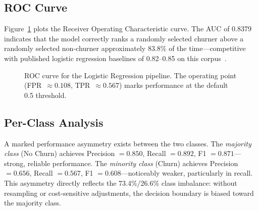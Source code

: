 \documentclass{llncs}
\begin{document}
\subsection{ROC Curve}

Figure~\ref{fig:roc} plots the Receiver Operating Characteristic curve.
The AUC of 0.8379 indicates that the model correctly ranks a randomly
selected churner above a randomly selected non-churner approximately
83.8\% of the time---competitive with published logistic regression
baselines of 0.82--0.85 on this corpus~\cite{huang2015customer}.

\begin{figure}[t]
\centering
{}
\caption{ROC curve for the Logistic Regression pipeline.
  The operating point (FPR~$\approx 0.108$, TPR~$\approx 0.567$) marks
  performance at the default 0.5 threshold.}
\label{fig:roc}
\end{figure}

\subsection{Per-Class Analysis}

A marked performance asymmetry exists between the two classes.
The \emph{majority class} (No Churn) achieves Precision $= 0.850$,
Recall $= 0.892$, F1 $= 0.871$---strong, reliable performance.
The \emph{minority class} (Churn) achieves Precision $= 0.656$,
Recall $= 0.567$, F1 $= 0.608$---noticeably weaker, particularly in
recall. This asymmetry directly reflects the 73.4\%/26.6\% class imbalance:
without resampling or cost-sensitive adjustments, the decision boundary
is biased toward the majority class.
\end{document}
